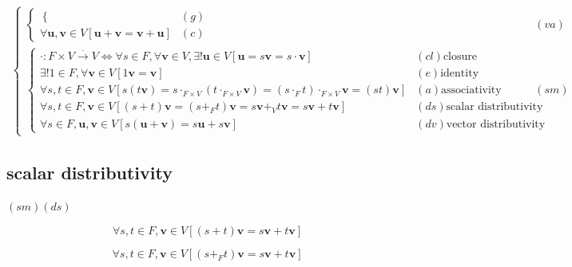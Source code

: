 \documentclass[
]{book}
\theoremstyle{definition}
\theoremstyle{definition}
\theoremstyle{definition}
\theoremstyle{definition}
\theoremstyle{remark}
\begin{document}
\[\begin{aligned}
\begin{cases}
\begin{cases}
\begin{cases}
\end{cases} & \left(g\right)\\
\forall\boldsymbol{u},\boldsymbol{v}\in V\left[\boldsymbol{u}+\boldsymbol{v}=\boldsymbol{v}+\boldsymbol{u}\right] & \left(c\right)
\end{cases} & \left(va\right)\\
\begin{cases}
\cdot:F\times V\overset{\cdot}{\rightarrow}V\Leftrightarrow\forall s\in F,\forall\boldsymbol{v}\in V,\exists!\boldsymbol{u}\in V\left[\boldsymbol{u}=s\boldsymbol{v}=s\cdot\boldsymbol{v}\right] & \left(cl\right)\text{closure}\\
\exists!1\in F,\forall\boldsymbol{v}\in V\left[1\boldsymbol{v}=\boldsymbol{v}\right] & \left(e\right)\text{identity}\\
\forall s,t\in F,\boldsymbol{v}\in V\left[s\left(t\boldsymbol{v}\right)=s\cdot_{{\scriptscriptstyle F\times V}}\left(t\cdot_{{\scriptscriptstyle F\times V}}\boldsymbol{v}\right)=\left(s\cdot_{{\scriptscriptstyle F}}t\right)\cdot_{{\scriptscriptstyle F\times V}}\boldsymbol{v}=\left(st\right)\boldsymbol{v}\right] & \left(a\right)\text{associativity}\\
\forall s,t\in F,\boldsymbol{v}\in V\left[\left(s+t\right)\boldsymbol{v}=\left(s+_{{\scriptscriptstyle F}}t\right)\boldsymbol{v}=s\boldsymbol{v}+_{{\scriptscriptstyle V}}t\boldsymbol{v}=s\boldsymbol{v}+t\boldsymbol{v}\right] & \left(ds\right)\text{scalar distributivity}\\
\forall s\in F,\boldsymbol{u},\boldsymbol{v}\in V\left[s\left(\boldsymbol{u}+\boldsymbol{v}\right)=s\boldsymbol{u}+s\boldsymbol{v}\right] & \left(dv\right)\text{vector distributivity}
\end{cases} & \left(sm\right)
\end{cases}
\end{aligned}
\]

\subsection{scalar distributivity}\label{scalar-distributivity}

\(\left(sm\right)\left(ds\right)\)

\[
\forall s,t\in F,\boldsymbol{v}\in V\left[\left(s+t\right)\boldsymbol{v}=s\boldsymbol{v}+t\boldsymbol{v}\right]
\]

\[
\forall s,t\in F,\boldsymbol{v}\in V\left[\left(s+_{{\scriptscriptstyle F}}t\right)\boldsymbol{v}=s\boldsymbol{v}+t\boldsymbol{v}\right]
\]
\end{document}
